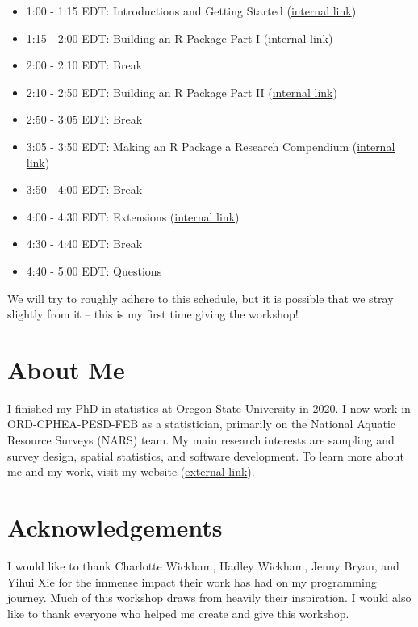 \documentclass[
]{book}
\providecommand{\tightlist}{%
  \setlength{\itemsep}{0pt}\setlength{\parskip}{0pt}}
\begin{document}
\begin{itemize}
\tightlist
\item
  1:00 - 1:15 EDT: Introductions and Getting Started (\protect\hyperlink{getting-started}{internal link})
\item
  1:15 - 2:00 EDT: Building an R Package Part I (\protect\hyperlink{r-package}{internal link})
\item
  2:00 - 2:10 EDT: Break
\item
  2:10 - 2:50 EDT: Building an R Package Part II (\protect\hyperlink{r-package}{internal link})
\item
  2:50 - 3:05 EDT: Break
\item
  3:05 - 3:50 EDT: Making an R Package a Research Compendium (\protect\hyperlink{r-package-rc}{internal link})
\item
  3:50 - 4:00 EDT: Break
\item
  4:00 - 4:30 EDT: Extensions (\protect\hyperlink{extensions}{internal link})
\item
  4:30 - 4:40 EDT: Break
\item
  4:40 - 5:00 EDT: Questions
\end{itemize}

We will try to roughly adhere to this schedule, but it is possible that we stray slightly from it -- this is my first time giving the workshop!

\hypertarget{about-me}{%
\section*{About Me}\label{about-me}}

I finished my PhD in statistics at Oregon State University in 2020. I now work in ORD-CPHEA-PESD-FEB as a statistician, primarily on the National Aquatic Resource Surveys (NARS) team. My main research interests are sampling and survey design, spatial statistics, and software development. To learn more about me and my work, visit my website (\href{https://michaeldumelle.github.io/}{external link}).

\hypertarget{acknowledgements}{%
\section*{Acknowledgements}\label{acknowledgements}}

I would like to thank Charlotte Wickham, Hadley Wickham, Jenny Bryan, and Yihui Xie for the immense impact their work has had on my programming journey. Much of this workshop draws from heavily their inspiration. I would also like to thank everyone who helped me create and give this workshop.
\end{document}
